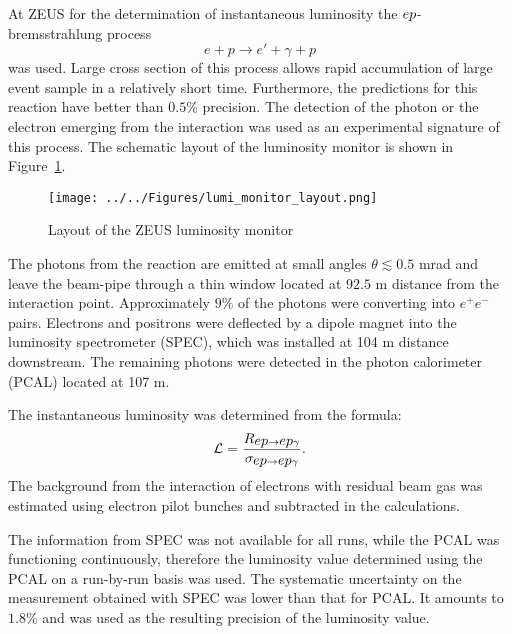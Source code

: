 At ZEUS for the determination of instantaneous luminosity the $\mbox{$e p$}$-bremsstrahlung process 
\begin{equation}
	e + p \rightarrow e' + \gamma + p
\end{equation}
was used. Large cross section of this process allows rapid accumulation of large event sample in a relatively short time. Furthermore, the predictions for this reaction have better than $0.5\%$ precision. The detection of the photon or the electron emerging from the interaction was used as an experimental signature of this process. The schematic layout of the luminosity monitor is shown in Figure~\ref{fig:lumi_monitor_layout}.
\begin{figure}
	\centering
		\texttt{[image: ../../Figures/lumi\_monitor\_layout.png]}
	\caption{Layout of the ZEUS luminosity monitor}
	\label{fig:lumi_monitor_layout}
\end{figure}
The photons from the reaction are emitted at small angles $\theta \lesssim 0.5$ mrad and leave the beam-pipe through a thin window located at $92.5$ m distance from the interaction point. Approximately $9\%$ of the photons were converting into $e^+e^-$ pairs. Electrons and positrons were deflected by a dipole magnet into the luminosity spectrometer (SPEC), which was installed at 104 m distance downstream. The remaining photons were detected in the photon calorimeter (PCAL) located at 107 m.

The instantaneous luminosity was determined from the formula:
\begin{equation}
\mathcal{L} = \frac{R_{\mbox{$e p$}\rightarrow \mbox{$e p$}\gamma}}{ \sigma_{\mbox{$e p$}\rightarrow \mbox{$e p$}\gamma}}.
\end{equation}
The background from the interaction of electrons with residual beam gas was estimated using electron pilot bunches and subtracted in the calculations.

The information from SPEC was not available for all runs, while the PCAL was functioning continuously, therefore the luminosity value determined using the PCAL on a run-by-run basis was used. The systematic uncertainty on the measurement obtained with SPEC was lower than that for PCAL. It amounts to $1.8\%$ and was used as the resulting precision of the luminosity value.

